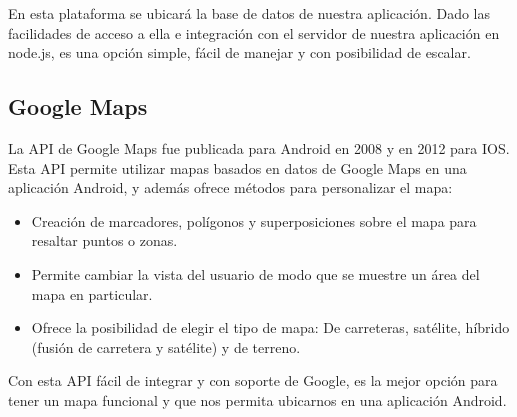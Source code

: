 En esta plataforma se ubicará la base de datos de nuestra aplicación. Dado las facilidades de acceso a ella e integración con el servidor de nuestra aplicación en node.js, es una opción simple, fácil de manejar y con posibilidad de escalar.

\subsection{ Google Maps }

La API de Google Maps \cite{URL::GoogleMapsApi} fue publicada para Android en 2008 y en 2012 para IOS. Esta API permite utilizar mapas basados en datos de Google Maps en una aplicación Android, y además ofrece métodos para personalizar el mapa:
\begin{itemize}
    \item Creación de marcadores, polígonos y superposiciones sobre el mapa para resaltar puntos o zonas. 
    \item Permite cambiar la vista del usuario de modo que se muestre un área del mapa en particular. 
    \item Ofrece la posibilidad de elegir el tipo de mapa: De carreteras, satélite, híbrido (fusión de carretera y satélite) y de terreno.
\end{itemize}

Con esta API fácil de integrar y con soporte de Google, es la mejor opción para tener un mapa funcional y que nos permita ubicarnos en una aplicación Android.


